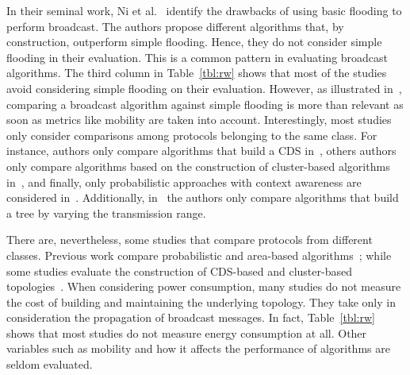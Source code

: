 In their seminal work, Ni et al.~\cite{Ni:1999:BSP:313451.313525} identify the drawbacks of using basic flooding to perform broadcast.
%
The authors propose different algorithms that, by construction, outperform simple flooding.
%
Hence, they do not consider simple flooding in their evaluation.
%
This is a common pattern in evaluating broadcast algorithms.
The third column in Table~\ref{tbl:rw} shows that most of the studies avoid considering simple flooding on their evaluation.
%
However, as illustrated in~\cite{YiGerla2003}, comparing a broadcast algorithm
against simple flooding is more than relevant as soon as metrics like mobility are taken into account.
%
%
Interestingly, most studies only consider comparisons among protocols
belonging to the same class.
%
For instance, authors only compare algorithms that build a CDS
in~\cite{Wu2004}, others authors only compare algorithms based on the
construction of cluster-based algorithms in~\cite{Nocetti2003}, and
finally, only probabilistic approaches with context awareness are
considered in~\cite{Cartigny:2003:BNR:2727141.2727459}.
%
Additionally, in~\cite{Cagalj2002} the authors only compare algorithms that build a tree by varying the transmission range.

There are, nevertheless, some studies that compare protocols from different classes.
%
Previous work compare probabilistic and area-based algorithms~\cite{Ni:1999:BSP:313451.313525, Garbinato2010}; while some studies evaluate the construction of CDS-based and cluster-based topologies~\cite{Stojmenovic:2002:DSN:506156.506158, WCM:WCM109}.
%
%
When considering power consumption, many studies do not measure the
cost of building and maintaining the underlying topology. They take
only in consideration the propagation of broadcast messages.
%
%
In fact, Table~\ref{tbl:rw} shows that most studies do not measure energy consumption at all.
%
Other variables such as mobility and how it affects the performance of algorithms are seldom evaluated.


